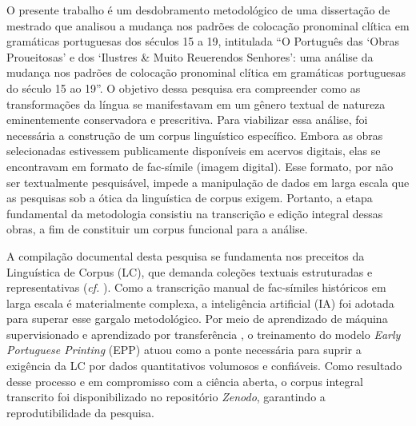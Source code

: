 \documentclass[portuguese]{textolivre}
\begin{document}
O presente trabalho é um desdobramento metodológico de uma dissertação de mestrado que analisou a mudança nos padrões de colocação pronominal clítica em gramáticas portuguesas dos séculos 15 a 19, intitulada “O Português das ‘Obras Proueitosas’ e dos ‘Ilustres \& Muito Reuerendos Senhores’: uma análise da mudança nos padrões de colocação pronominal clítica em gramáticas portuguesas do século 15 ao 19”. O objetivo dessa pesquisa era compreender como as transformações da língua se manifestavam em um gênero textual de natureza eminentemente conservadora e prescritiva. Para viabilizar essa análise, foi necessária a construção de um corpus linguístico específico. Embora as obras selecionadas estivessem publicamente disponíveis em acervos digitais, elas se encontravam em formato de fac-símile (imagem digital). Esse formato, por não ser textualmente pesquisável, impede a manipulação de dados em larga escala que as pesquisas sob a ótica da linguística de corpus exigem. Portanto, a etapa fundamental da metodologia consistiu na transcrição e edição integral dessas obras, a fim de constituir um corpus funcional para a análise.

A compilação documental desta pesquisa se fundamenta nos preceitos da Linguística de Corpus (LC), que demanda coleções textuais estruturadas e representativas (\textit{cf.} \textcite{mcenery2012corpus}). Como a transcrição manual de fac-símiles históricos em larga escala é materialmente complexa, a inteligência artificial (IA) foi adotada para superar esse gargalo metodológico. Por meio de aprendizado de máquina supervisionado e aprendizado por transferência \cite{wang2021object}, o treinamento do modelo \textit{Early Portuguese Printing} (EPP) atuou como a ponte necessária para suprir a exigência da LC por dados quantitativos volumosos e confiáveis. Como resultado desse processo e em compromisso com a ciência aberta, o corpus integral transcrito foi disponibilizado no repositório \textit{Zenodo}, garantindo a reprodutibilidade da pesquisa.
\end{document}
